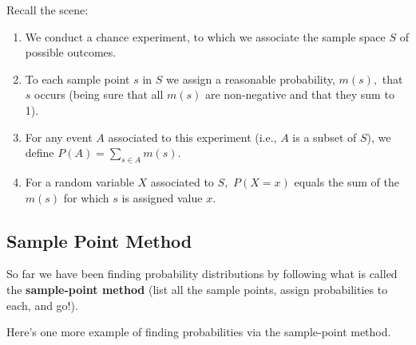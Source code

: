 \documentclass[
]{book}
\providecommand{\tightlist}{%
  \setlength{\itemsep}{0pt}\setlength{\parskip}{0pt}}
\theoremstyle{definition}
\theoremstyle{definition}
\theoremstyle{definition}
\theoremstyle{definition}
\theoremstyle{remark}
\begin{document}
Recall the scene:

\begin{enumerate}
\def\labelenumi{\arabic{enumi})}
\tightlist
\item
  We conduct a chance experiment, to which we associate the sample space \(S\) of possible outcomes.
\item
  To each sample point \(s\) in \(S\) we assign a reasonable probability, \(m(s),\) that \(s\) occurs (being sure that all \(m(s)\) are non-negative and that they sum to 1).
\item
  For any event \(A\) associated to this experiment (i.e., \(A\) is a subset of \(S\)), we define \(\displaystyle P(A) = \sum_{s \in A} m(s).\)
\item
  For a random variable \(X\) associated to \(S,\) \(P(X = x)\) equals the sum of the \(m(s)\) for which \(s\) is assigned value \(x\).
\end{enumerate}

\subsection{Sample Point Method}\label{sample-point-method}

So far we have been finding probability distributions by following what is called the \textbf{sample-point method} (list all the sample points, assign probabilities to each, and go!).

Here's one more example of finding probabilities via the sample-point method.
\end{document}
